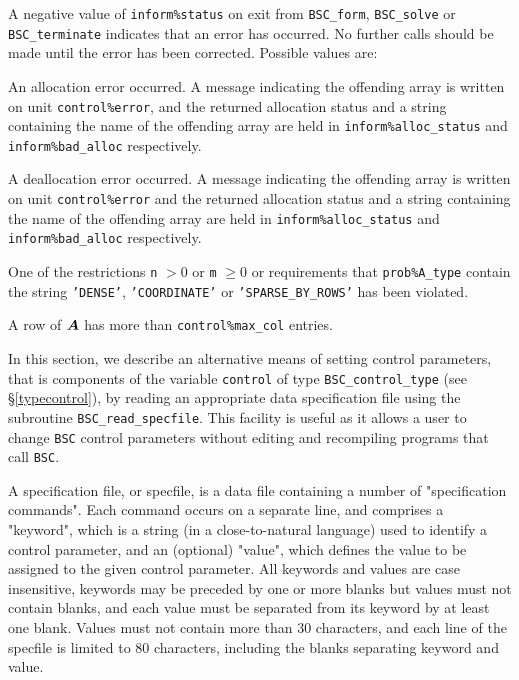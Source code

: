 \documentclass{galahad}
\newcommand{\packagename}{BSC}
\begin{document}
\galerrors
A negative value of {\tt inform\%status} on exit from 
{\tt \packagename\_form}, 
{\tt \packagename\_solve}
or 
{\tt \packagename\_terminate}
indicates that an error has occurred. No further calls should be made
until the error has been corrected. Possible values are:

\begin{description}

 An allocation error occurred. 
A message indicating the offending 
array is written on unit {\tt control\%error}, and the returned allocation 
status and a string containing the name of the offending array
are held in {\tt inform\%alloc\_\-status}
and {\tt inform\%bad\_alloc} respectively.

 A deallocation error occurred. 
A message indicating the offending 
array is written on unit {\tt control\%error} and the returned allocation 
status and a string containing the name of the offending array
are held in {\tt inform\%alloc\_\-status}
and {\tt inform\%bad\_alloc} respectively.

 One of the restrictions 
   {\tt n} $> 0$ or {\tt m} $\geq  0$
    or requirements that {\tt prob\%A\_type}
    contain the string
    {\tt 'DENSE'}, {\tt 'COORDINATE'} or {\tt 'SPARSE\_BY\_ROWS'}
    has been violated.

\itt{\galerrschurcomplement}
A row of ${\bm{A}}$ has more than {\tt control\%max\_col} entries.

\end{description}


\galfeatures
\noindent In this section, we describe an alternative means of setting 
control parameters, that is components of the variable {\tt control} of type
{\tt \packagename\_control\_type}
(see \S\ref{typecontrol}), 
by reading an appropriate data specification file using the
subroutine {\tt \packagename\_read\_specfile}. This facility
is useful as it allows a user to change  {\tt \packagename} control parameters 
without editing and recompiling programs that call {\tt \packagename}.

A specification file, or specfile, is a data file containing a number of 
"specification commands". Each command occurs on a separate line, 
and comprises a "keyword", 
which is a string (in a close-to-natural language) used to identify a 
control parameter, and 
an (optional) "value", which defines the value to be assigned to the given
control parameter. All keywords and values are case insensitive, 
keywords may be preceded by one or more blanks but
values must not contain blanks, and
each value must be separated from its keyword by at least one blank.
Values must not contain more than 30 characters, and 
each line of the specfile is limited to 80 characters,
including the blanks separating keyword and value.
\end{document}
